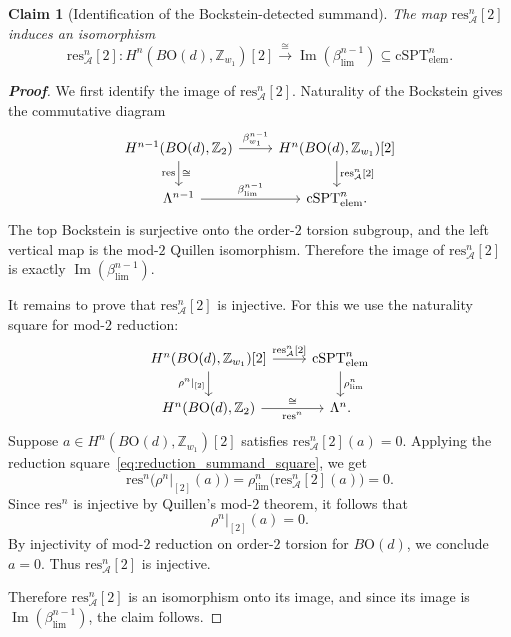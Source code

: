 \documentclass[aps,prx,reprint,superscriptaddress,twocolumn,amsmath,amssymb,amsfonts, nofootinbib]{revtex4-2}
\newcommand{\res}{\text{res}}
\theoremstyle{apsstyle}
\newtheorem{claim}{Claim}
\begin{document}
\bigskip 

\begin{claim}[Identification of the Bockstein-detected summand] 
\label{claim:bockstein_summand} 
The map $\res_{\mathcal A}^{n}[2]$ induces an isomorphism 
\begin{equation} 
\res_{\mathcal A}^{n}[2]: H^n(B\mathrm{O}(d),\mathbb Z_{w_1})[2] \xrightarrow{\cong} \operatorname{Im}(\beta_{\lim}^{n-1}) \subseteq \mathrm{cSPT}_{\mathrm{elem}}^n . 
\end{equation}
\end{claim} 
\begin{proof}[\textnormal{\textbf{Proof}}]
We first identify the image of $\res_{\mathcal A}^{n}[2]$. Naturality of the Bockstein gives the commutative diagram 
\begin{equation} 
\begin{tikzcd} 
H^{n-1}(B\mathrm{O}(d),\mathbb Z_2) \arrow[r,"\beta_{w_1}^{n-1}"] \arrow[d,"\res"',"\cong"] & H^n(B\mathrm{O}(d),\mathbb Z_{w_1})[2] \arrow[d,"\res_{\mathcal A}^{n}\text{[}2\text{]}"] \\ 
\Lambda^{n-1} \arrow[r,"\beta_{\lim}^{n-1}"] & \mathrm{cSPT}_{\mathrm{elem}}^n . 
\end{tikzcd} 
\end{equation} 
The top Bockstein is surjective onto the order-$2$ torsion subgroup, and the left vertical map is the mod-$2$ Quillen isomorphism. Therefore the image of $\res_{\mathcal A}^{n}[2]$ is exactly $\operatorname{Im}(\beta_{\lim}^{n-1})$. 

\bigskip 

It remains to prove that $\res_{\mathcal A}^{n}[2]$ is injective. For this we use the naturality square for mod-$2$ reduction:
\begin{equation}
\begin{tikzcd}
H^n(B\mathrm{O}(d),\mathbb Z_{w_1})[2]
    \arrow[r,"\res_{\mathcal A}^{n}\text{[}2\text{]}"]
    \arrow[d,"\rho^n\vert_{[2]}"']
&
\mathrm{cSPT}_{\mathrm{elem}}^n
    \arrow[d,"\rho_{\lim}^{n}"]
\\
H^n(B\mathrm{O}(d),\mathbb Z_2)
    \arrow[r,"\res^{n}"',"\cong"]
&
\Lambda^n .
\end{tikzcd}
\label{eq:reduction_summand_square}
\end{equation}
Suppose $a\in H^n(B\mathrm{O}(d),\mathbb Z_{w_1})[2]$ satisfies $\res_{\mathcal A}^{n}[2](a)=0$. Applying the reduction square~\eqref{eq:reduction_summand_square}, we get
\begin{equation}
\res^{n}\bigl(\rho^n\vert_{[2]}(a)\bigr)
=\rho_{\lim}^{n}\bigl(\res_{\mathcal A}^{n}[2](a)\bigr) = 0.
\end{equation}
Since $\res^{n}$ is injective by Quillen's mod-$2$ theorem, it follows that
\begin{equation}
\rho^n\vert_{[2]}(a)=0.
\end{equation}
By injectivity of mod-$2$ reduction on order-$2$ torsion for $B\mathrm{O}(d)$, we conclude $a=0$. Thus $\res_{\mathcal A}^{n}[2]$ is injective. 

\noindent Therefore $\res_{\mathcal A}^{n}[2]$ is an isomorphism onto its image, and since its image is
$\operatorname{Im}(\beta_{\lim}^{n-1})$, the claim follows.
\end{proof}
\end{document}
